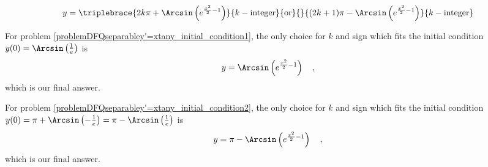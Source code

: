 {\[
y=\triplebrace{ 2 k \pi+\Arcsin\left( e^{\frac{x^2}{2}-1} \right)}{k -\text{integer}}{\text{or}}{}{(2k+1)\pi- \Arcsin\left( e^{\frac{x^2}{2}-1} \right)}{k-\text{integer}}
\]

For problem \ref{problemDFQseparabley'=xtany_initial_condition1}, 
the only choice for $k$ and sign which fits the initial condition $y(0)= \Arcsin\left(\frac{1}{e}\right)$ is
\[
y=\Arcsin\left(e^{\frac{x^2}{2}-1} \right)\quad ,
\]
which is our final answer. 

For problem \ref{problemDFQseparabley'=xtany_initial_condition2}, 
the only choice for $k$ and sign which fits the initial condition $y(0)=\pi+ \Arcsin\left(-\frac{1}{e}\right)=\pi- \Arcsin \left( \frac{1}{e}\right) $ is
\[
y=\pi- \Arcsin\left(e^{\frac{x^2}{2}-1} \right)\quad, 
\]
which is our final answer.
}

